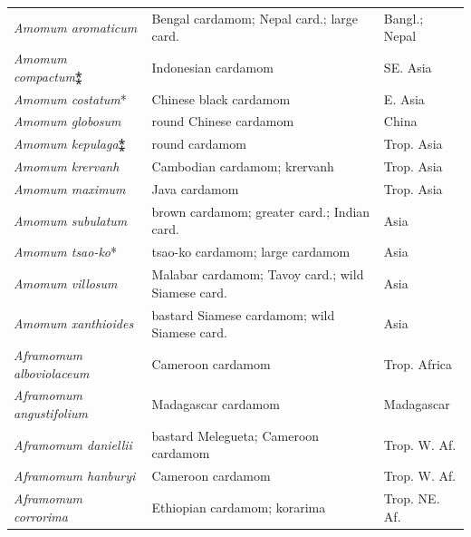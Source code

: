 
\begin{table}[!ht]
\centering
\begin{tabularx}{\linewidth}{@{}lXl@{}}
\toprule
\textit{Amomum aromaticum} & Bengal cardamom; Nepal card.; large card. & Bangl.; Nepal \\
\textit{Amomum compactum}⁑ & Indonesian cardamom & SE. Asia \\
\textit{Amomum costatum}* & Chinese black cardamom & E. Asia \\
\textit{Amomum globosum} & round Chinese cardamom & China \\
\textit{Amomum kepulaga}⁑ & round cardamom & Trop. Asia \\
\textit{Amomum krervanh} & Cambodian cardamom; krervanh & Trop. Asia \\
\textit{Amomum maximum} & Java cardamom & Trop. Asia \\
\textit{Amomum subulatum} & brown cardamom; greater card.; Indian card. & Asia \\
\textit{Amomum tsao-ko}* & tsao-ko cardamom; large cardamom & Asia \\
\textit{Amomum villosum} & Malabar cardamom; Tavoy card.; wild Siamese card. & Asia \\
\textit{Amomum xanthioides} & bastard Siamese cardamom; wild Siamese card. & Asia \\
\textit{Aframomum alboviolaceum} & Cameroon cardamom & Trop. Africa \\
\textit{Aframomum angustifolium} & Madagascar cardamom & Madagascar \\
\textit{Aframomum daniellii} & bastard Melegueta; Cameroon cardamom & Trop. W. Af. \\
\textit{Aframomum hanburyi} & Cameroon cardamom & Trop. W. Af. \\
\textit{Aframomum corrorima} & Ethiopian cardamom; korarima & Trop. NE. Af. \\

\end{tabularx}
\end{table}
